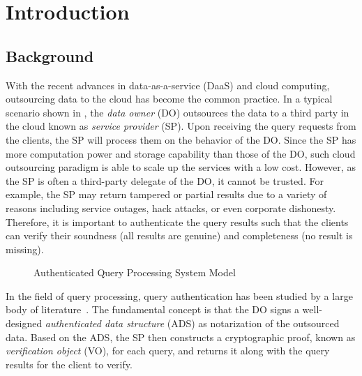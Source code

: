 \chapter{Introduction}\label{chap:intro}

\section{Background}

With the recent advances in data-as-a-service (DaaS) and cloud computing, outsourcing data to the cloud has become the common practice. In a typical scenario shown in , the \emph{data owner} (DO) outsources the data to a third party in the cloud known as \emph{service provider} (SP). Upon receiving the query requests from the clients, the SP will process them on the behavior of the DO\@. Since the SP has more computation power and storage capability than those of the DO, such cloud outsourcing paradigm is able to scale up the services with a low cost. However, as the SP is often a third-party delegate of the DO, it cannot be trusted. For example, the SP may return tampered or partial results due to a variety of reasons including service outages, hack attacks, or even corporate dishonesty. Therefore, it is important to authenticate the query results such that the clients can verify their soundness (all results are genuine) and completeness (no result is missing).

\begin{figure}[h]
  \centering
  \resizebox{.7\linewidth}{!}{}
  \caption{Authenticated Query Processing System Model}\label{fig:intro:model}
\end{figure}

In the field of query processing, query authentication has been studied by a large body of literature~\cite{10.1109/ICDE.2004.1320027,10.1145/1142473.1142488,10.1007/s00778-008-0113-2,10.1145/1880022.1880026,10.1145/2213836.2213871,10.1145/2463676.2465281,10.14778/2732219.2732224,10.1145/2664243.2664244,10.1145/2723372.2747649,10.1109/tkde.2014.2316818}. The fundamental concept is that the DO signs a well-designed \emph{authenticated data structure} (ADS) as notarization of the outsourced data. Based on the ADS, the SP then constructs a cryptographic proof, known as \emph{verification object} (VO), for each query, and returns it along with the query results for the client to verify.

